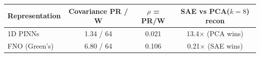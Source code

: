 \begin{tabular}{lccc}
\toprule
Representation & Covariance PR / W & $\rho$ = PR/W & SAE vs PCA($k{=}8$) recon \\
\midrule
1D PINNs & 1.34 / 64 & 0.021 & 13.4$\times$ (PCA wins) \\
FNO (Green's) & 6.80 / 64 & 0.106 & 0.21$\times$ (SAE wins) \\
\bottomrule
\end{tabular}
